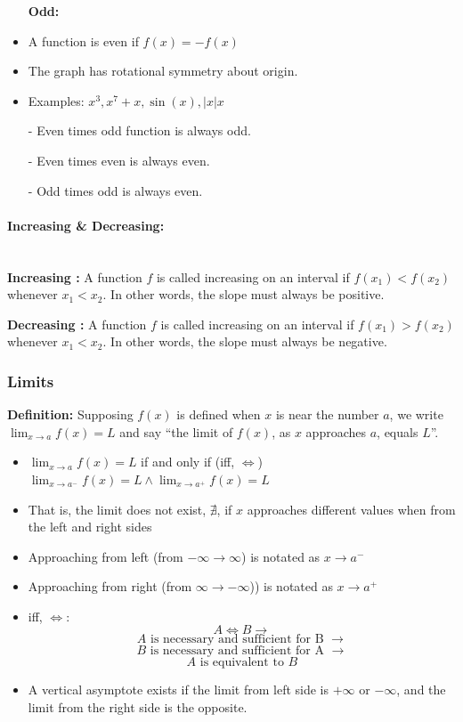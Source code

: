 \documentclass[12pt]{article}
\newcommand{\paragraphNewLine}[1]{\paragraph{#1}\mbox{}\\}
\begin{document}
\begin{itemize}
    \item[] \textbf{Odd: }
    \item A function is even if $f(x) = -f(x)$
    \item The graph has rotational symmetry about origin.
    \item Examples: $x^3, x^{7}+x, \sin(x), |x|x$
\end{itemize}

\noindent\hrulefill

\begin{itemize}
    \item[-] Even times odd function is always odd.
    \item[-] Even times even is always even.
    \item[-] Odd times odd is always even.
\end{itemize}

\paragraphNewLine{Increasing \& Decreasing:}

\textbf{Increasing : } A  function $f$ is called increasing on an interval if $f(x_1) < f(x_2)$ whenever $x_1 < x_2$. In other words, the slope must always be positive.

\textbf{Decreasing : } A  function $f$ is called increasing on an interval if $f(x_1) > f(x_2)$ whenever $x_1 < x_2$. In other words, the slope must always be negative.


\subsubsection{Limits}

\textbf{Definition: } Supposing $f(x)$ is defined when $x$ is near the number $a$, we write $\lim_{x\to a} f(x) = L$ and say ``the limit of $f(x)$, as $x$ approaches $a$, equals $L$''.


\begin{itemize}
    \item $\lim_{x\to a} f(x) = L$ if and only if (iff, $\iff$) $\lim_{x\to a^-} f(x) = L \wedge \lim_{x\to a^+} f(x) = L$
    \item That is, the limit does not exist, $\nexists$, if $x$ approaches different values when from the left and right sides 
    \item Approaching from left (from $-\infty \to \infty$) is notated as $x \to a^-$
    \item Approaching from right (from $\infty \to -\infty$)) is notated as $x \to a^+$
    \item iff, $\iff$:
        $$A \iff B \rightarrow{}$$
        $$A \text{ is necessary and sufficient for B }\rightarrow{}$$
        $$B \text{ is necessary and sufficient for A } \rightarrow{}$$
        $$A \text{ is equivalent to } B$$
    \item A vertical asymptote exists if the limit from left side is $+\infty$ or $-\infty$, and the limit from the right side is the opposite.
\end{itemize}
\end{document}
